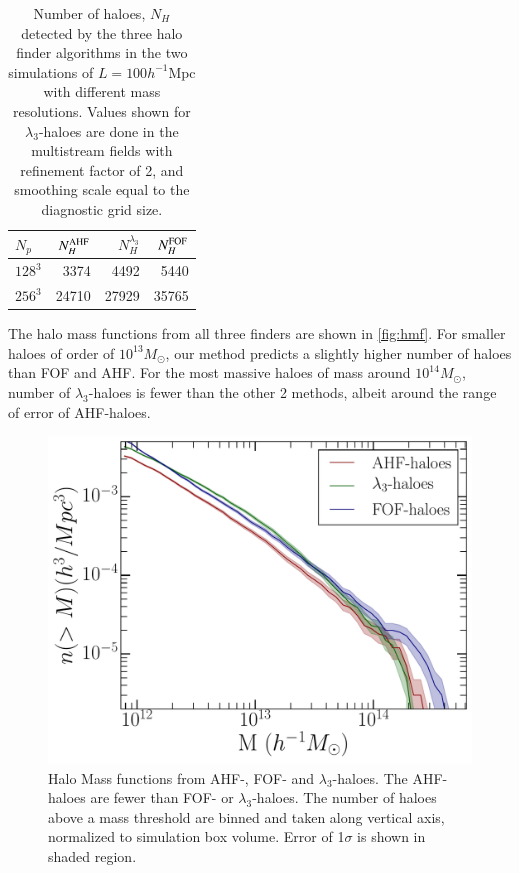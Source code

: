 \begin{table}
\centering
  \caption{Number of haloes, $N_H$ detected by the three halo finder algorithms in the two simulations of $L = 100 h^{-1} \text{Mpc}$ with different mass resolutions. Values shown for $\lambda_3$-haloes are done in the multistream fields with refinement factor of 2, and smoothing scale equal to the diagnostic grid size.}
\begin{tabular}{|l|r|r|r|}
\hline
$N_p$  &  $N_H^{\rm AHF}$ & $N_H^{\lambda_3}$ &  $N_H^{\rm FOF}$  \\ \hline
$128^3$   & 3374  & 4492 &  5440  \\ \hline
$256^3$   & 24710  & 27929 & 35765  \\ \hline

\end{tabular}
\label{tab:HaloFinderMF}
\end{table}



The halo mass functions from all three finders are shown in \autoref{fig:hmf}. For smaller haloes of order of $10^{13} M_{\odot}$, our method predicts a slightly higher number of haloes than FOF and AHF. For the most massive haloes of mass around $10^{14} M_{\odot}$, number of $\lambda_3$-haloes is fewer than the other 2 methods, albeit around the range of error of AHF-haloes.  


\begin{figure}
\begin{minipage}[t]{.99\linewidth}
 \centering\includegraphics[width=10.cm]{Chapter5/Source_v2/fig10.pdf} 
\end{minipage}\hfill
\caption{Halo Mass functions from AHF-, FOF- and $\lambda_3$-haloes. The AHF-haloes are fewer than FOF- or $\lambda_3$-haloes. The number of haloes above a mass threshold are binned and taken along vertical axis, normalized to simulation box volume. Error of 1$\sigma$ is shown in shaded region. }
\label{fig:hmf}
\end{figure}


